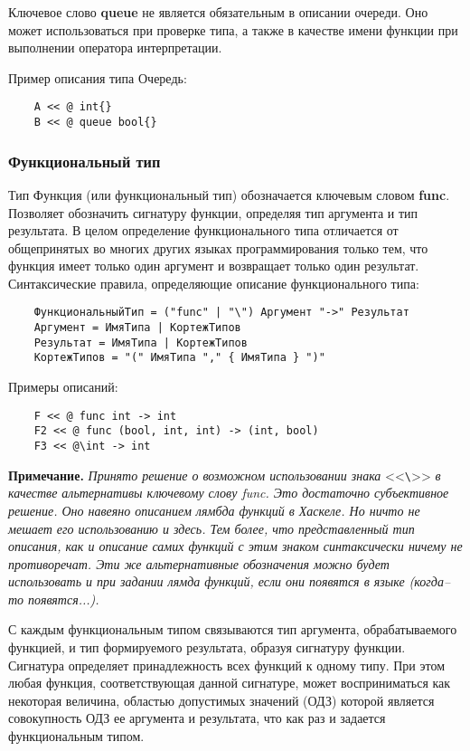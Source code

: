 {Ключевое слово \textbf{queue} не является обязательным в описании очереди. Оно может использоваться при проверке типа, а также в качестве имени функции при выполнении оператора интерпретации.

Пример описания типа Очередь:

\begin{verbatim}
    A << @ int{}
    B << @ queue bool{}
\end{verbatim}

\subsubsection{Функциональный тип}

Тип Функция (или функциональный тип) обозначается ключевым словом \textbf{func}. Позволяет обозначить сигнатуру функции, определяя тип аргумента и тип результата. В целом определение функционального типа отличается от общепринятых во многих других языках программирования только тем, что функция имеет только один аргумент и возвращает только один результат. Синтаксические правила, определяющие описание функционального типа:

\begin{verbatim}
    ФункциональныйТип = ("func" | "\") Аргумент "->" Результат
    Аргумент = ИмяТипа | КортежТипов
    Результат = ИмяТипа | КортежТипов
    КортежТипов = "(" ИмяТипа "," { ИмяТипа } ")"
\end{verbatim}

Примеры описаний:

\begin{verbatim}
    F << @ func int -> int
    F2 << @ func (bool, int, int) -> (int, bool)
    F3 << @\int -> int
\end{verbatim}

\textbf{Примечание.}
\textit{Принято решение о возможном использовании знака} <<\verb|\|>> \textit{в качестве альтернативы ключевому слову func. Это достаточно субъективное решение. Оно навеяно описанием лямбда функций в Хаскеле. Но ничто не мешает его использованию и здесь. Тем более, что представленный тип описания, как и описание самих функций с этим знаком синтаксически ничему не противоречат. Эти же альтернативные обозначения можно будет использовать и при задании лямда функций, если они появятся в языке (когда--то появятся...).}

С каждым функциональным типом связываются тип аргумента, обрабатываемого функцией, и тип формируемого результата, образуя сигнатуру функции. Сигнатура определяет принадлежность всех функций к одному типу. При этом любая функция, соответствующая данной сигнатуре, может восприниматься как некоторая величина, областью допустимых значений (ОДЗ) которой является совокупность ОДЗ ее аргумента и результата, что как раз и задается функциональным типом.

}
